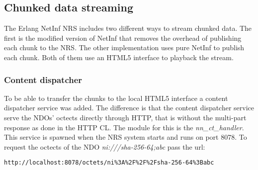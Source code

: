 \subsection{Chunked data streaming}

The Erlang NetInf NRS includes two different ways to stream chunked data. The first is the modified version of NetInf that removes the overhead of publishing each chunk to the NRS. The other implementation uses pure NetInf to publish each chunk. Both of them use an HTML5 interface to playback the stream. 


\subsubsection{Content dispatcher}

To be able to transfer the chunks to the local HTML5 interface a content dispatcher service was added. The difference is that the content dispatcher service serve the NDOs' octects directly through HTTP, that is without the multi-part response as done in the HTTP CL. The module for this is the \textit{nn\_ct\_handler}. This service is spawned when the NRS system starts and runs on port 8078. To request the octects of the NDO \textit{ni:///sha-256-64;abc} pass the url:

\begin{verbatim}
http://localhost:8078/octets/ni%3A%2F%2F%2Fsha-256-64%3Babc 
\end{verbatim}
